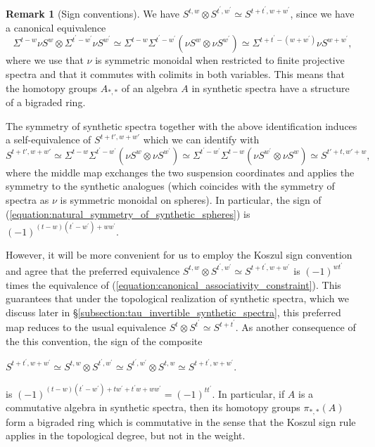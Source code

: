 \documentclass[oneside,a4paper]{amsart}
\theoremstyle{plain}
\theoremstyle{definition}
\newtheorem{rem}[thm]{Remark}
\theoremstyle{remark}
\begin{document}
\begin{rem}[Sign conventions]
\label{rem:associativity_equivalence_for_synthetic_spheres_and_sign_rule_for_commutative_bigraded_rings}
We have $S^{t, w} \otimes S^{t^\prime, w^\prime} \simeq S^{t + t^\prime, w + w^\prime}$, since we have a canonical equivalence
\begin{equation}
\label{equation:canonical_associativity_constraint} 
\Sigma^{t-w} \nu S^{w} \otimes \Sigma^{t^\prime - w^\prime} \nu S^{w^\prime} \simeq \Sigma^{t-w} \Sigma^{t^\prime - w^\prime} (\nu S^{w} \otimes \nu S^{w^\prime}) \simeq \Sigma^{t+t^\prime-(w+w^\prime)} \nu S^{w+w^\prime}, 
\end{equation}
where we use that $\nu$ is symmetric monoidal when restricted to finite projective spectra and that it commutes with colimits in both variables. This means that the homotopy groups $A_{*, *}$ of an algebra $A$ in synthetic spectra have a structure of a bigraded ring. 

The symmetry of synthetic spectra together with the above identification induces a self-equivalence of $S^{t+t', w+w'}$ which we can identify with 
\begin{equation}
\label{equation:natural_symmetry_of_synthetic_spheres}
S^{t+t', w+w'} \simeq \Sigma^{t-w} \Sigma^{t^\prime - w^\prime} (\nu S^{w} \otimes \nu S^{w^\prime}) \simeq \Sigma^{t^\prime-w^\prime} \Sigma^{t-w} (\nu S^{w^\prime} \otimes \nu S^{w}) \simeq S^{t'+t, w'+w},
\end{equation}
where the middle map exchanges the two suspension coordinates and applies the symmetry to the synthetic analogues (which coincides with the symmetry of spectra as $\nu$ is symmetric monoidal on spheres). In particular, the sign of (\ref{equation:natural_symmetry_of_synthetic_spheres}) is $(-1)^{(t-w)(t^\prime-w^\prime) + w w^\prime}$.

However, it will be more convenient for us to employ the Koszul sign convention and agree that the preferred equivalence $S^{t, w} \otimes S^{t^\prime, w^\prime} \simeq S^{t+t^\prime, w+w^\prime}$ is $(-1)^{wt^\prime}$ times the equivalence of (\ref{equation:canonical_associativity_constraint}). This guarantees that under the topological realization of synthetic spectra, which we discuss later in \S\ref{subsection:tau_invertible_synthetic_spectra}, this preferred map reduces to the usual equivalence $S^{t} \otimes S^{t^\prime} \simeq S^{t + t^\prime}$. As another consequence of the this convention, the sign of the composite

\begin{center}
$S^{t + t^\prime, w+w^\prime} \simeq S^{t, w} \otimes S^{t^\prime, w^\prime} \simeq S^{t^\prime, w^\prime} \otimes S^{t, w} \simeq S^{t + t^\prime, w+w^\prime}$. 
\end{center}
is $(-1)^{(t-w)(t^\prime - w^\prime) + tw^\prime + t^\prime w + ww^\prime} = (-1)^{tt^\prime}$. In particular, if $A$ is a commutative algebra in synthetic spectra, then its homotopy groups $\pi_{*, *}(A)$ form a bigraded ring which is commutative in the sense that the Koszul sign rule applies in the topological degree, but not in the weight.
\end{rem}
\end{document}
